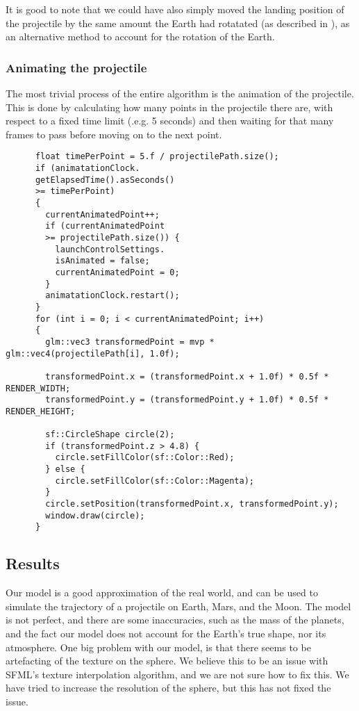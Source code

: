 \documentclass[main.tex]{subfiles}
\begin{document}
It is good to note that we could have also simply moved the landing position of the projectile by the same amount the Earth had rotatated (as described in \cite{handout}), as an alternative
method to account for the rotation of the Earth.

\subsubsection{Animating the projectile}
The most trivial process of the entire algorithm is the animation of the projectile. This is done by calculating 
how many points in the projectile there are, with respect to a fixed time limit (.e.g. 5 seconds) and then waiting
for that many frames to pass before moving on to the next point.
\begin{lstlisting}
      float timePerPoint = 5.f / projectilePath.size();
      if (animatationClock.
      getElapsedTime().asSeconds() 
      >= timePerPoint)
      {
        currentAnimatedPoint++;
        if (currentAnimatedPoint 
        >= projectilePath.size()) {
          launchControlSettings.
          isAnimated = false;
          currentAnimatedPoint = 0;
        }
        animatationClock.restart();
      }
      for (int i = 0; i < currentAnimatedPoint; i++)
      {
		glm::vec3 transformedPoint = mvp * glm::vec4(projectilePath[i], 1.0f);

		transformedPoint.x = (transformedPoint.x + 1.0f) * 0.5f * RENDER_WIDTH;
		transformedPoint.y = (transformedPoint.y + 1.0f) * 0.5f * RENDER_HEIGHT;

		sf::CircleShape circle(2);
		if (transformedPoint.z > 4.8) {
		  circle.setFillColor(sf::Color::Red);
		} else {
		  circle.setFillColor(sf::Color::Magenta);
		}
		circle.setPosition(transformedPoint.x, transformedPoint.y);
		window.draw(circle);
      }
\end{lstlisting}

\subsection{Results}
Our model is a good approximation of the real world, and can be used to simulate the trajectory of a projectile on Earth, Mars, and the Moon.
The model is not perfect, and there are some inaccuracies, such as the mass of the planets, and the fact our model does not account for the Earth's true shape, nor its atmosphere.
One big problem with our model, is that there seems to be artefacting of the texture on the sphere. We believe this to be an issue with SFML's texture interpolation
algorithm, and we are not sure how to fix this. We have tried to increase the resolution of the sphere, but this has not fixed the issue.
\end{document}

